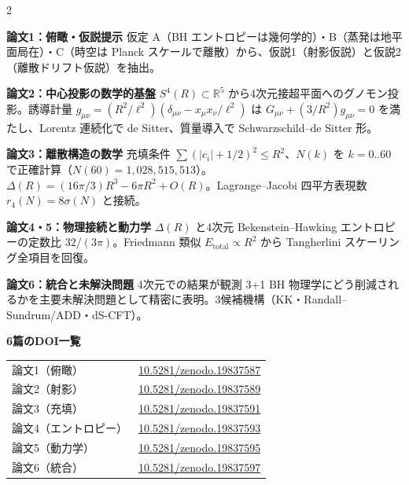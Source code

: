 \documentclass[9pt,a4paper]{ltjsarticle}
\begin{document}
\begin{multicols}{2}
\small

\textbf{論文1：俯瞰・仮説提示}\enspace
仮定 A（BH エントロピーは幾何学的）・B（蒸発は地平面局在）・C（時空は Planck スケールで離散）から、仮説1（射影仮説）と仮説2（離散ドリフト仮説）を抽出。

\smallskip
\textbf{論文2：中心投影の数学的基盤}\enspace
$S^4(R) \subset \mathbb{R}^5$ から4次元接超平面へのグノモン投影。誘導計量 $g_{\mu\nu} = (R^2/\ell^2)(\delta_{\mu\nu} - x_\mu x_\nu/\ell^2)$ は $G_{\mu\nu} + (3/R^2)g_{\mu\nu} = 0$ を満たし、Lorentz 連続化で de Sitter、質量導入で Schwarzschild--de Sitter 形。

\smallskip
\textbf{論文3：離散構造の数学}\enspace
充填条件 $\sum (|c_i|+1/2)^2 \le R^2$、$N(k)$ を $k = 0..60$ で正確計算（$N(60) = 1{,}028{,}515{,}513$）。$\Delta(R) = (16\pi/3)R^3 - 6\pi R^2 + O(R)$。Lagrange--Jacobi 四平方表現数 $r_4(N) = 8\sigma(N)$ と接続。

\smallskip
\textbf{論文4・5：物理接続と動力学}\enspace
$\Delta(R)$ と4次元 Bekenstein--Hawking エントロピーの定数比 $32/(3\pi)$。Friedmann 類似 $E_{\mathrm{total}} \propto R^2$ から Tangherlini スケーリング全項目を回復。

\smallskip
\textbf{論文6：統合と未解決問題}\enspace
4次元での結果が観測 3+1 BH 物理学にどう削減されるかを主要未解決問題として精密に表明。3候補機構（KK・Randall--Sundrum/ADD・dS-CFT）。

\vspace{6pt}
\textbf{6篇のDOI一覧}

\vspace{1pt}
{\footnotesize
\begin{tabular}{@{}ll@{}}
論文1（俯瞰）  & \href{https://doi.org/10.5281/zenodo.19837587}{10.5281/zenodo.19837587} \\
論文2（射影） & \href{https://doi.org/10.5281/zenodo.19837589}{10.5281/zenodo.19837589} \\
論文3（充填） & \href{https://doi.org/10.5281/zenodo.19837591}{10.5281/zenodo.19837591} \\
論文4（エントロピー） & \href{https://doi.org/10.5281/zenodo.19837593}{10.5281/zenodo.19837593} \\
論文5（動力学） & \href{https://doi.org/10.5281/zenodo.19837595}{10.5281/zenodo.19837595} \\
論文6（統合） & \href{https://doi.org/10.5281/zenodo.19837597}{10.5281/zenodo.19837597} \\
\end{tabular}
}


\end{multicols}
\end{document}
